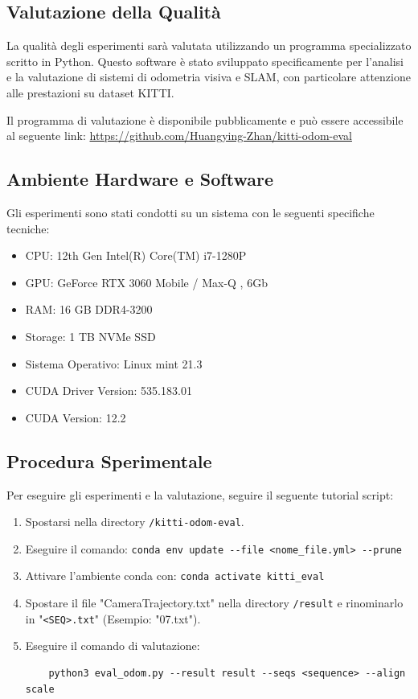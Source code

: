 \documentclass[12pt,a4paper]{report}
\begin{document}
\subsection{Valutazione della Qualità}

La qualità degli esperimenti sarà valutata utilizzando un programma specializzato scritto in Python. Questo software è stato sviluppato specificamente per l'analisi e la valutazione di sistemi di odometria visiva e SLAM, con particolare attenzione alle prestazioni su dataset KITTI.

Il programma di valutazione è disponibile pubblicamente e può essere accessibile al seguente link:
\url{https://github.com/Huangying-Zhan/kitti-odom-eval}

\subsection{Ambiente Hardware e Software}

Gli esperimenti sono stati condotti su un sistema con le seguenti specifiche tecniche:

\begin{itemize}
    \item CPU: 12th Gen Intel(R) Core(TM) i7-1280P
    \item GPU: GeForce RTX 3060 Mobile / Max-Q , 6Gb
    \item RAM: 16 GB DDR4-3200
    \item Storage: 1 TB NVMe SSD
    \item Sistema Operativo: Linux mint 21.3
    \item CUDA Driver Version: 535.183.01  
    \item CUDA Version: 12.2
\end{itemize}

\subsection{Procedura Sperimentale}

Per eseguire gli esperimenti e la valutazione, seguire il seguente tutorial script:

\begin{enumerate}
    \item Spostarsi nella directory \texttt{/kitti-odom-eval}.
    \item Eseguire il comando: \verb|conda env update --file <nome_file.yml> --prune|
    \item Attivare l'ambiente conda con: \verb|conda activate kitti_eval|
    \item Spostare il file "CameraTrajectory.txt" nella directory \texttt{/result} e rinominarlo in "\texttt{<SEQ>.txt}" (Esempio: "07.txt").
    \item Eseguire il comando di valutazione: 
    \begin{verbatim}
    python3 eval_odom.py --result result --seqs <sequence> --align scale
    \end{verbatim}
\end{enumerate}
\end{document}

